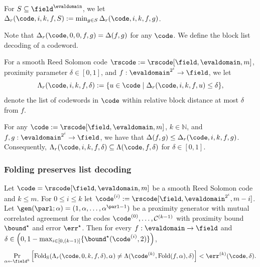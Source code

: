 \begin{definition}\label{def:min_block_rel_distance}
    For $S \subseteq \field^{\evaldomain}$, we let $\Delta_{r}(\code, i, k, f, S) := \min_{g \in S} \Delta_{r}(\code, i, k, f, g)$.
\end{definition}

{Note that $\Delta_{r}(\code, 0, 0, f, g) = \Delta(f, g)$ for any $\code$. We define the block list decoding of a codeword.}

\begin{definition}\label{def:list_close_codewords_block}
    For a smooth Reed Solomon code $\rscode := \rscode[\field, \evaldomain, m]$, proximity parameter $\delta \in [0,1]$, and $f : \evaldomain^{2^i} \to \field$, we let
    \[
    \Lambda_{r}(\code, i, k, f, \delta) := \{ u \in \code \mid \Delta_{r}(\code, i, k, f, u) \leq \delta \},
    \]
    denote the list of codewords in $\code$ within relative block distance at most $\delta$ from $f$.
\end{definition}

\begin{lemma}\label{lemma:block_rel_distance}
    For any $\code := \rscode[\field, \evaldomain, m]$, $k \in \mathbb{N}$, and $f, g : \evaldomain^{2^i} \to \field$, we have that $\Delta(f, g) \leq \Delta_{r}(\code, i, k, f, g)$. Consequently, $\Lambda_{r}(\code, i, k, f, \delta) \subseteq \Lambda(\code, f, \delta)$ for $\delta\in[0,1]$.
\end{lemma}

\subsubsection{Folding preserves list decoding}

\begin{theorem}\label{thm:folding_preserves_listdecoding}
    Let $\code = \rscode[\field, \evaldomain, m]$ be a smooth Reed Solomon code and $k \leq m$. For $0 \leq i \leq k$ let $\code^{(i)} := \rscode[\field, \evaldomain^{2^i}, m - i]$. Let $\gen(\parl; \alpha) = (1, \alpha, \ldots, \alpha^{\parl - 1})$ be a proximity generator with mutual correlated agreement for the codes $\code^{(0)}, \ldots, \mathcal{C}^{(k-1)}$ with proximity bound ${\bound}^\star$ and error $\err^\star$. Then for every $f : \evaldomain \to \field$ and $\delta \in \left(0, 1 - \max_{i \in [0,(k-1)]} \{ {\bound}^\star(\code^{(i)}, 2) \} \right)$,
    \[
    \Pr_{\alpha \leftarrow \field^k} \left[
    \mathrm{Fold_S}(\Lambda_{r}(\code, 0, k, f, \delta), \alpha)
    \neq \Lambda(\code^{(k)}, \mathrm{Fold}(f, \alpha), \delta)
    \right] < \err^{(k)}(\code, \delta).
    \]
\end{theorem}

